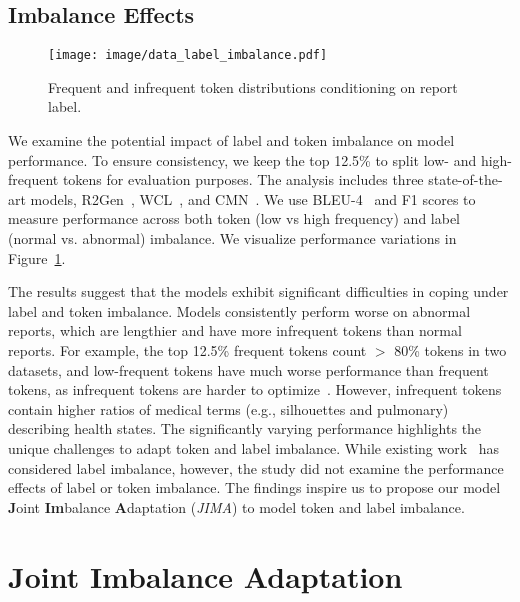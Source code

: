 \documentclass[sn-mathphys-num]{sn-jnl}%
\theoremstyle{thmstyleone}%
\theoremstyle{thmstyletwo}%
\theoremstyle{thmstylethree}%
\begin{document}
\subsection{Imbalance Effects}
\begin{figure}[htp]
    \centering 
    \caption{Frequent and infrequent token distributions conditioning on report label. }
    \texttt{[image: image/data\_label\_imbalance.pdf]}
    \label{fig:label_imbalance}
\end{figure}

We examine the potential impact of label and token imbalance on model performance. 
To ensure consistency, we keep the top 12.5\% to split low- and high-frequent tokens for evaluation purposes.
The analysis includes three state-of-the-art models, R2Gen~\citep{chen2020generating}, WCL~\citep{yan2021weakly}, and CMN~\citep{chen2021cross}.
We use BLEU-4~\citep{papineni2002bleu} and F1 scores to measure performance across both token (low vs high frequency) and label (normal vs. abnormal) imbalance. 
We visualize performance variations in Figure~\ref{fig:label_imbalance}.


The results suggest that the models exhibit significant difficulties in coping under label and token imbalance.
Models consistently perform worse on abnormal reports, which are lengthier and have more infrequent tokens than normal reports. 
For example, the top 12.5\% frequent tokens count $>$ 80\% tokens in two datasets, and low-frequent tokens have much worse performance than frequent tokens, as infrequent tokens are harder to optimize~\citep{yu2022rare}.
However, infrequent tokens contain higher ratios of medical terms (e.g., silhouettes and pulmonary) describing health states.
The significantly varying performance highlights the unique challenges to adapt token and label imbalance.
While existing work~\citep{nishino2020reinforcement} has considered label imbalance, however, the study did not examine the performance effects of label or token imbalance.
The findings inspire us to propose our model \textbf{J}oint \textbf{Im}balance \textbf{A}daptation (\textit{JIMA}) to model token and label imbalance.


\section{Joint Imbalance Adaptation}
\end{document}
